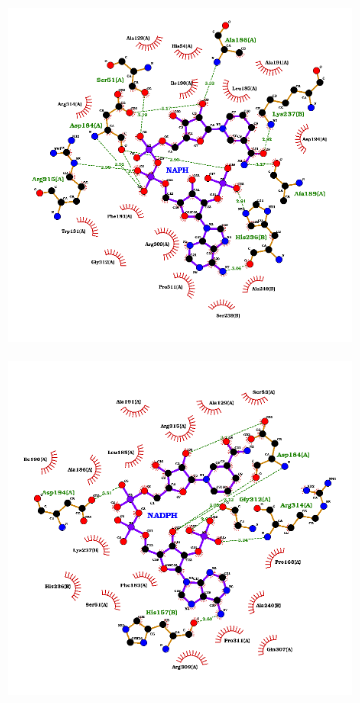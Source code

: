 \documentclass[12pt]{article}
\begin{document}
	\FloatBarrier
	\begin{figure}
		\centering
		\begin{subfigure}[h!]{0.47\textwidth}
			\includegraphics[width=\textwidth]{../10/Dock/best.png}
			\caption{}
		\end{subfigure}
		\hfill
		\begin{subfigure}[h!]{0.47\textwidth}
			\includegraphics[width=\textwidth]{../10/Dock/best2.png}

\end{subfigure}
\end{figure}
\end{document}
